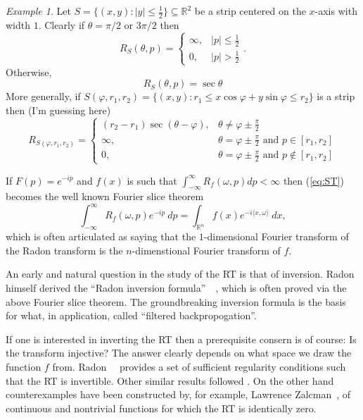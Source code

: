 \documentclass{amsart}
\theoremstyle{remark}
\newtheorem{example}[theorem]{Example}
\numberwithin{equation}{section}
\newcommand{\RR}{\mathbb{R}}
\begin{document}
\begin{example}
Let $S = \{(x,y) : |y| \leq \frac12\} \subseteq \RR^2$ be a strip centered on the $x$-axis with width $1$. Clearly if $\theta = \pi/2$ or $3\pi/2$ then 
\[
    R_S(\theta, p) = 
    \begin{cases}
        \infty, & |p| \leq \frac12 \\
        0, & |p| > \frac12
    \end{cases}.
\]
Otherwise, 
\[
    R_S(\theta, p) = \sec \theta
\]
More generally, if $S(\varphi, r_1, r_2) = \{(x,y) : r_1 \leq x \cos \varphi + y \sin \varphi \leq r_2\}$ is a strip then (I'm guessing here)
\[
    R_{S(\varphi, r_1, r_2)} =
    \begin{cases}
        (r_2 - r_1) \sec (\theta - \varphi), & \theta \neq \varphi \pm \frac\pi2 \\
        \infty, & \theta = \varphi \pm \frac\pi2 \text{ and } p \in [r_1, r_2] \\
        0, & \theta = \varphi \pm \frac\pi2 \text{ and } p \not\in [r_1,r_2]
    \end{cases}
\]
\end{example}

If $F(p) = e^{-ip}$ and $f(x)$ is such that $\int_{-\infty}^\infty R_f(\omega, p) dp < \infty$ then (\ref{eq:ST}) becomes the well known Fourier slice theorem
\[
    \int_{-\infty}^\infty R_f(\omega, p) e^{-ip} ~dp
    = \int_{\mathbb{R}^n} f(x) e^{-i\langle x, \omega\rangle} ~dx,
\]
which is often articulated as saying that the $1$-dimensional Fourier transform of the Radon transform is the $n$-dimenstional Fourier transform of $f$.

An early and natural question in the study of the RT is that of inversion. Radon himself derived the ``Radon inversion formula''~\cite{Rado17}~\cite{Rado86}, which is often proved via the above Fourier slice theorem. The groundbreaking inversion formula is the basis for what, in application, called ``filtered backpropogation''.

If one is interested in inverting the RT then a prerequisite consern is of course: Is the transform injective? The answer clearly depends on what space we draw the function $f$ from. Radon~\cite{Rado17}~\cite{Rado86} provides a set of sufficient regularity conditions such that the RT is invertible. Other similar results followed \cite{????}. On the other hand counterexamples have been constructed by, for example, Lawrence Zalcman~\cite{Zalc82}, of continuous and nontrivial functions for which the RT is identically zero.
\end{document}
